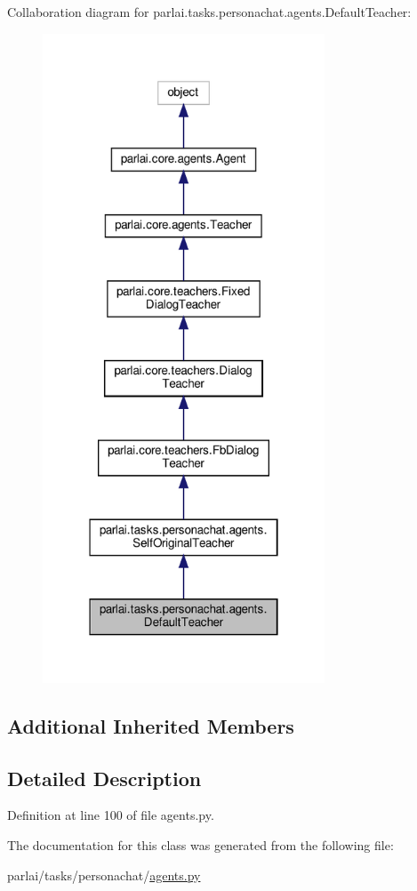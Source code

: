 Collaboration diagram for parlai.\+tasks.\+personachat.\+agents.\+Default\+Teacher\+:
\nopagebreak
\begin{figure}[H]
\begin{center}
\leavevmode
\includegraphics[width=238pt]{d4/db1/classparlai_1_1tasks_1_1personachat_1_1agents_1_1DefaultTeacher__coll__graph}
\end{center}
\end{figure}
\subsection*{Additional Inherited Members}


\subsection{Detailed Description}


Definition at line 100 of file agents.\+py.



The documentation for this class was generated from the following file\+:\begin{DoxyCompactItemize}
\item 
parlai/tasks/personachat/\hyperlink{parlai_2tasks_2personachat_2agents_8py}{agents.\+py}\end{DoxyCompactItemize}
